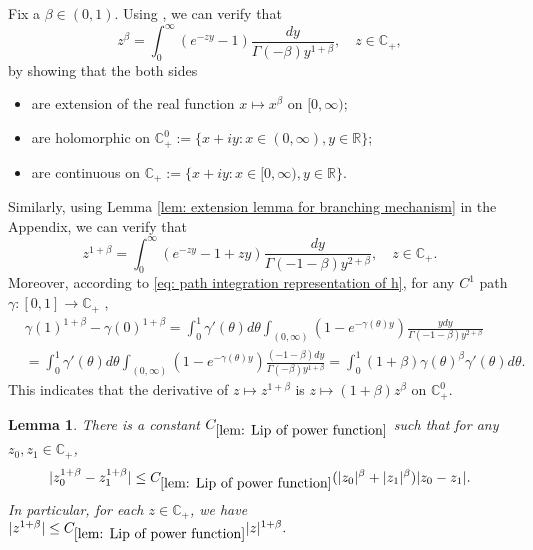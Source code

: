 \documentclass[12pt,oneside,english]{amsart}
\theoremstyle{plain}
\newtheorem{lem}[thm]{Lemma}
\theoremstyle{definition}
\numberwithin{equation}{section}
\begin{document}
    Fix a $\beta \in (0,1)$.
    Using \cite[Theorem 3.2. \& Theorem 3.5.]{SchillingSongVondracek2010Bernstein}, we can verify that
\begin{equation}
    z^{\beta}
	= \int_0^\infty (e^{-zy}-1) \frac{dy}{\Gamma(-\beta)y^{1+\beta}},
    \quad z\in \mathbb C_+,
\end{equation}
	by showing that the both sides
\begin{itemize}
\item
    are extension of the real function $x\mapsto x^{\beta}$ on $[0,\infty)$;
\item
    are holomorphic on $\mathbb C_+^0:= \{x+iy:x\in (0,\infty), y\in \mathbb R\}$;
\item
    are continuous on $\mathbb C_+ :=\{x+iy: x\in [0,\infty), y\in \mathbb R\}$.
\end{itemize}
    Similarly, using Lemma \ref{lem: extension lemma for branching mechanism} in the Appendix, we can verify that
\begin{equation}
\label{eq: stable branching on C+}
    z^{1+\beta}
    = \int_0^\infty (e^{-zy}-1+zy)\frac{dy}{\Gamma(-1-\beta)y^{2+\beta}},
    \quad z\in \mathbb C_+.
\end{equation}
    Moreover, according to \eqref{eq: path integration representation of h}, for any $C^1$ path $\gamma:[0,1]\to \mathbb C_+$ ,
\begin{align}
\label{eq: integration formula for 1+beta-th power of z}
    &\gamma(1)^{1+\beta} - \gamma(0)^{1+\beta}
    = \int_0^1 \gamma'(\theta)d\theta \int_{(0,\infty)}(1-e^{-\gamma(\theta)y})\frac{ydy}{\Gamma(-1-\beta)y^{2+\beta}}
    \\&=\int_0^1 \gamma'(\theta)d\theta \int_{(0,\infty)}(1-e^{-\gamma(\theta)y})\frac{(-1-\beta)dy}{\Gamma(-\beta)y^{1+\beta}}
    = \int_0^1 (1+\beta) \gamma(\theta)^{\beta} \gamma'(\theta)d\theta.
\end{align}
    This indicates that the derivative of $z\mapsto z^{1+\beta}$ is $z\mapsto (1+\beta)z^{\beta}$ on $\mathbb C^0_+$.
\begin{lem}
\label{lem: Lip of power function}
    There is a constant $C_{\ref{lem: Lip of power function}}$ such that for any $z_0,z_1 \in \mathbb C_+$,
\begin{equation}
\label{eq: Lip of power function}
    |z_0^{1+\beta} - z_1^{1+\beta}|
    \leq C_{\ref{lem: Lip of power function}}(|z_0|^{\beta}+|z_1|^{\beta})|z_0 - z_1|.
\end{equation}
    In particular, for each $z\in \mathbb C_+$, we have
$
    |z^{1+\beta}|
    \leq  C_{\ref{lem: Lip of power function}} |z|^{1+\beta}.
$

\end{lem}
\end{document}
